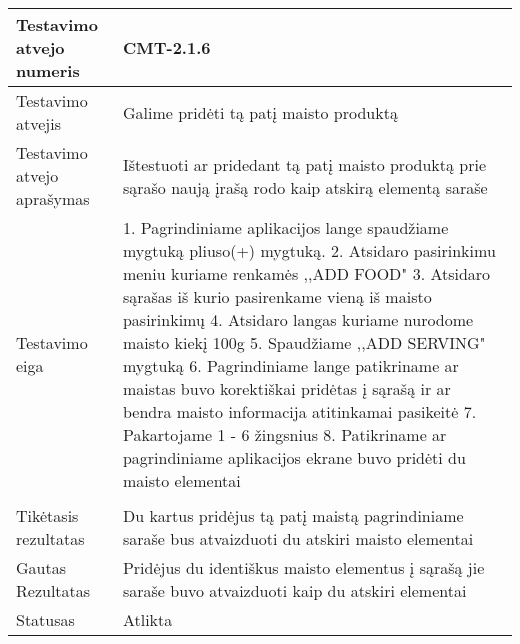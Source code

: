 \documentclass[oneside]{VUMIFPSkursinis}
\begin{document}
\begin{center}
    \begin{tabular}{ |p{5cm}|p{13cm}|}
    \hline
        Testavimo atvejo numeris &  CMT-2.1.6\\ \hline
        Testavimo atvejis & Galime pridėti tą patį maisto produktą  \\ \hline
        Testavimo atvejo aprašymas & Ištestuoti ar pridedant tą patį maisto produktą prie sąrašo naują įrašą rodo kaip atskirą elementą saraše  \\ \hline
        Testavimo eiga &  1. Pagrindiniame aplikacijos lange spaudžiame mygtuką pliuso(+) mygtuką. 
				2. Atsidaro pasirinkimu meniu kuriame renkamės ,,ADD FOOD"
				3. Atsidaro sąrašas iš kurio pasirenkame vieną iš maisto pasirinkimų
				4. Atsidaro langas kuriame nurodome maisto kiekį 100g
				5. Spaudžiame ,,ADD SERVING"  mygtuką
				6. Pagrindiniame lange patikriname ar maistas buvo korektiškai pridėtas į sąrašą ir ar bendra maisto informacija atitinkamai pasikeitė
				7. Pakartojame 1 - 6 žingsnius
				8. Patikriname ar pagrindiniame aplikacijos ekrane buvo pridėti du maisto elementai \\ \hline
			\\ \hline
        Tikėtasis rezultatas &  Du kartus pridėjus tą patį maistą pagrindiniame saraše bus atvaizduoti du atskiri maisto elementai\\ \hline
        Gautas Rezultatas &  Pridėjus du identiškus maisto elementus į sąrašą jie saraše buvo atvaizduoti kaip du atskiri elementai\\ \hline
        Statusas & Atlikta \\ \hline
    \hline
    \end{tabular}
\end{center}
\end{document}
